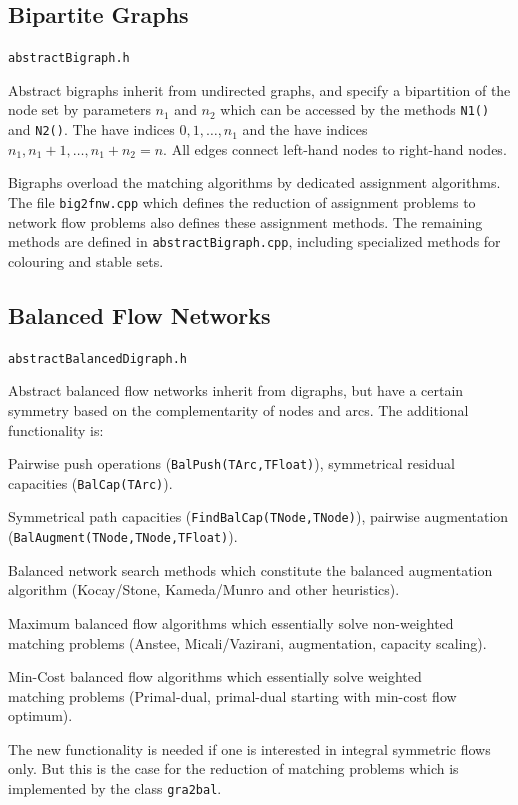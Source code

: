 \documentclass[a4paper,11pt,twoside]{book}
\begin{document}
\begin{multicols}{2}
\subsection{Bipartite Graphs}
\myinclude\verb/abstractBigraph.h/

\bigskip\noindent
Abstract bigraphs inherit from undirected graphs, and specify a bipartition
of the node set by parameters $n_1$ and $n_2$ which can be accessed by the
methods \verb/N1()/ and \verb/N2()/. The  have indices
$0,1,\dots,n_1$ and the  have indices
$n_1,n_1+1,\dots,n_1+n_2=n$. All edges connect left-hand nodes to right-hand nodes.

Bigraphs overload the matching algorithms by dedicated assignment algorithms.
The file \verb/big2fnw.cpp/ which defines the reduction of assignment problems
to network flow problems also defines these assignment methods. The remaining
methods are defined in \verb/abstractBigraph.cpp/, including specialized methods
for colouring and stable sets.


\subsection{Balanced Flow Networks}
\myinclude\verb/abstractBalancedDigraph.h/

\bigskip\noindent
Abstract balanced flow networks inherit from digraphs, but have a certain symmetry
based on the complementarity of nodes and arcs. The additional functionality is:
\begin{myitemize}
\item Pairwise push operations (\verb/BalPush(TArc,TFloat)/),
    symmetrical residual capacities (\verb/BalCap(TArc)/).
\item Symmetrical path capacities (\verb/FindBalCap(TNode,TNode)/),
    pairwise augmentation (\verb/BalAugment(TNode,TNode,TFloat)/).
\item Balanced network search methods which constitute the balanced augmentation
    algorithm (Kocay/Stone, Kameda/Munro and other heuristics).
\item Maximum balanced flow algorithms which essentially solve non-weighted
    matching problems (Anstee, Micali/Vazirani, augmentation, capacity
    scaling).
\item Min-Cost balanced flow algorithms which essentially solve weighted \\
    matching problems (Primal-dual, primal-dual starting with min-cost flow
    optimum).
\end{myitemize}
The new functionality is needed if one is interested in integral symmetric
flows only. But this is the case for the reduction of matching problems which is
implemented by the class \verb/gra2bal/.


\end{multicols}
\end{document}
